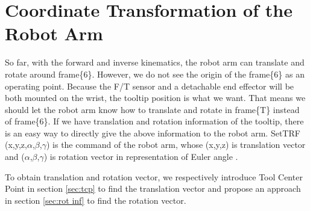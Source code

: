 \section{Coordinate Transformation of the Robot Arm}
\label{sec:ref_robot}
\hspace*{6mm}So far, with the forward and inverse kinematics, the robot arm can translate and rotate around frame\{6\}. However, we do not see the origin of the frame\{6\} as an operating point. Because the F/T sensor and a detachable end effector will be both mounted on the wrist, the tooltip position is what we want. That means we should let the robot arm know how to translate and rotate in frame\{T\} instead of frame\{6\}. If we have translation and rotation information of the tooltip, there is an easy way to directly give the above information to the robot arm. SetTRF (x,y,z,$\alpha$,$\beta$,$\gamma$) is the command of the robot arm, whose (x,y,z) is translation vector and ($\alpha$,$\beta$,$\gamma$) is rotation vector in representation of Euler angle .
\par
To obtain translation and rotation vector, we respectively introduce Tool Center Point in section \ref{sec:tcp} to find the translation vector and propose an approach in section \ref{sec:rot inf} to find the rotation vector.							
